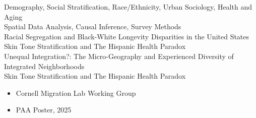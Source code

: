 \documentclass[11pt]{article} %
\begin{document}
\large{} Demography, Social Stratification, Race/Ethnicity, Urban Sociology, Health and Aging \\
\large{} Spatial Data Analysis, Causal Inference, Survey Methods \\


Racial Segregation and Black-White Longevity Disparities in the United States \\

Skin Tone Stratification and The Hispanic Health Paradox \\

Unequal Integration?: The Micro-Geography and Experienced Diversity of Integrated Neighborhoods \\

Skin Tone Stratification and The Hispanic Health Paradox
\begin{itemize}
\item  Cornell Migration Lab Working Group
\item PAA Poster, 2025
\end{itemize}
\end{document}
